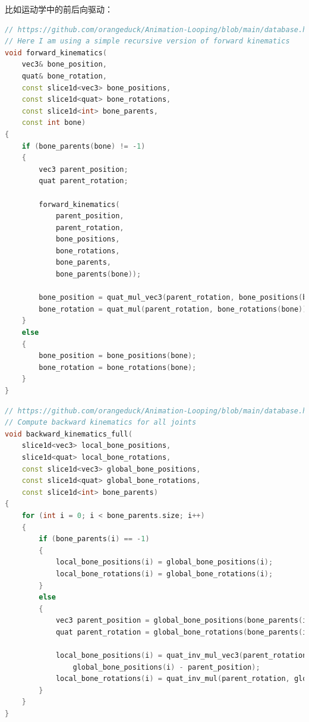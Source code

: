 \documentclass[lang=cn,newtx,10pt,scheme=chinese]{elegantbook}
\begin{document}
比如运动学中的前后向驱动：
\begin{lstlisting}[language=C++]  % 前向运动FK
// https://github.com/orangeduck/Animation-Looping/blob/main/database.h
// Here I am using a simple recursive version of forward kinematics
void forward_kinematics(
    vec3& bone_position,
    quat& bone_rotation,
    const slice1d<vec3> bone_positions,
    const slice1d<quat> bone_rotations,
    const slice1d<int> bone_parents,
    const int bone)
{
    if (bone_parents(bone) != -1)
    {
        vec3 parent_position;
        quat parent_rotation;
        
        forward_kinematics(
            parent_position,
            parent_rotation,
            bone_positions,
            bone_rotations,
            bone_parents,
            bone_parents(bone));
        
        bone_position = quat_mul_vec3(parent_rotation, bone_positions(bone)) + parent_position;
        bone_rotation = quat_mul(parent_rotation, bone_rotations(bone));
    }
    else
    {
        bone_position = bone_positions(bone);
        bone_rotation = bone_rotations(bone); 
    }
}
\end{lstlisting}

\begin{lstlisting}[language=C++]  % 反向运动IK
// https://github.com/orangeduck/Animation-Looping/blob/main/database.h
// Compute backward kinematics for all joints
void backward_kinematics_full(
    slice1d<vec3> local_bone_positions,
    slice1d<quat> local_bone_rotations,
    const slice1d<vec3> global_bone_positions,
    const slice1d<quat> global_bone_rotations,
    const slice1d<int> bone_parents)
{
    for (int i = 0; i < bone_parents.size; i++)
    {
        if (bone_parents(i) == -1)
        {
            local_bone_positions(i) = global_bone_positions(i);
            local_bone_rotations(i) = global_bone_rotations(i);
        }
        else
        {
            vec3 parent_position = global_bone_positions(bone_parents(i));
            quat parent_rotation = global_bone_rotations(bone_parents(i));

            local_bone_positions(i) = quat_inv_mul_vec3(parent_rotation,
                global_bone_positions(i) - parent_position);
            local_bone_rotations(i) = quat_inv_mul(parent_rotation, global_bone_rotations(i));
        }
    }
}
\end{lstlisting}
\end{document}
